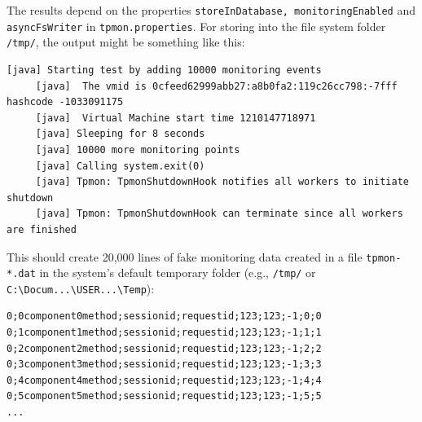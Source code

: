 \documentclass[a4paper,12pt]{scrartcl}
\begin{document}
The results depend on the properties \texttt{storeInDatabase, monitoringEnabled} and \texttt{asyncFsWriter} in \texttt{tpmon.properties}. For storing into the file system folder \texttt{/tmp/}, the output might be something like this:

\begin{lstlisting}[caption={Output example for storage test},label={lst4}]
 [java] Starting test by adding 10000 monitoring events
     [java]  The vmid is 0cfeed62999abb27:a8b0fa2:119c26cc798:-7fff hashcode -1033091175
     [java]  Virtual Machine start time 1210147718971
     [java] Sleeping for 8 seconds
     [java] 10000 more monitoring points
     [java] Calling system.exit(0)
     [java] Tpmon: TpmonShutdownHook notifies all workers to initiate shutdown
     [java] Tpmon: TpmonShutdownHook can terminate since all workers are finished
\end{lstlisting}

This should create 20,000 lines of fake monitoring data created in a file \texttt{tpmon-*.dat} in the system's default temporary folder (e.g., \texttt{/tmp/} or \verb=C:\Docum...\USER...\Temp=):
\begin{lstlisting}[caption={Example fake monitoring data produced by the storage test},label={lst5}]
0;0component0method;sessionid;requestid;123;123;-1;0;0
0;1component1method;sessionid;requestid;123;123;-1;1;1
0;2component2method;sessionid;requestid;123;123;-1;2;2
0;3component3method;sessionid;requestid;123;123;-1;3;3
0;4component4method;sessionid;requestid;123;123;-1;4;4
0;5component5method;sessionid;requestid;123;123;-1;5;5
...
\end{lstlisting}
\end{document}
